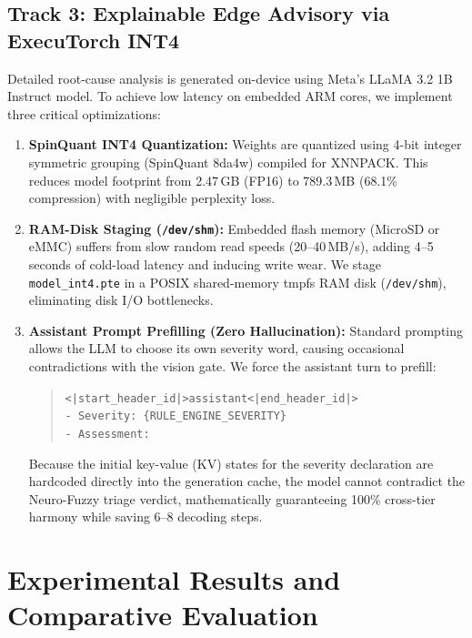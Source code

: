 \documentclass[conference]{IEEEtran}
\begin{document}
\subsection{Track 3: Explainable Edge Advisory via ExecuTorch INT4}
Detailed root-cause analysis is generated on-device using Meta's LLaMA 3.2 1B Instruct model. To achieve low latency on embedded ARM cores, we implement three critical optimizations:
\begin{enumerate}
    \item \textbf{SpinQuant INT4 Quantization:} Weights are quantized using 4-bit integer symmetric grouping (SpinQuant 8da4w) compiled for XNNPACK. This reduces model footprint from 2.47\,GB (FP16) to 789.3\,MB (68.1\% compression) with negligible perplexity loss.
    \item \textbf{RAM-Disk Staging (\texttt{/dev/shm}):} Embedded flash memory (MicroSD or eMMC) suffers from slow random read speeds (20--40\,MB/s), adding 4--5 seconds of cold-load latency and inducing write wear. We stage \texttt{model\_int4.pte} in a POSIX shared-memory tmpfs RAM disk (\texttt{/dev/shm}), eliminating disk I/O bottlenecks.
    \item \textbf{Assistant Prompt Prefilling (Zero Hallucination):} Standard prompting allows the LLM to choose its own severity word, causing occasional contradictions with the vision gate. We force the assistant turn to prefill:
    \begin{quote}
    \scriptsize
    \texttt{<|start\_header\_id|>assistant<|end\_header\_id|>}\\
    \texttt{- Severity: \{RULE\_ENGINE\_SEVERITY\}}\\
    \texttt{- Assessment:}
    \end{quote}
    Because the initial key-value (KV) states for the severity declaration are hardcoded directly into the generation cache, the model cannot contradict the Neuro-Fuzzy triage verdict, mathematically guaranteeing 100\% cross-tier harmony while saving 6--8 decoding steps.
\end{enumerate}

\section{Experimental Results and Comparative Evaluation}
\end{document}
